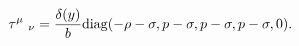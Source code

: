 \begin{equation}
\label{1eq8}  \tau^{\mu}~_\nu = \frac{\delta(y)}{b}{\rm
diag}(-\rho-\sigma,p-\sigma,p-\sigma,p-\sigma,0).
\end{equation}

